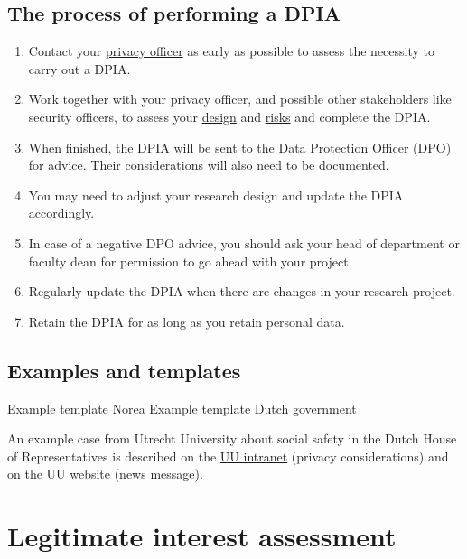 \documentclass[
]{book}
\providecommand{\tightlist}{%
  \setlength{\itemsep}{0pt}\setlength{\parskip}{0pt}}
\begin{document}
\hypertarget{dpia-process}{%
\subsection{The process of performing a DPIA}\label{dpia-process}}

\begin{enumerate}
\def\labelenumi{\arabic{enumi}.}
\tightlist
\item
  Contact your \protect\hyperlink{support}{privacy officer} as early as possible to assess the
  necessity to carry out a DPIA.
\item
  Work together with your privacy officer, and possible other stakeholders like
  security officers, to assess your \protect\hyperlink{privacy-by-design}{design} and
  \protect\hyperlink{risk-assessment}{risks} and complete the DPIA.
\item
  When finished, the DPIA will be sent to the Data Protection Officer (DPO) for
  advice. Their considerations will also need to be documented.
\item
  You may need to adjust your research design and update the DPIA accordingly.
\item
  In case of a negative DPO advice, you should ask your head of department or
  faculty dean for permission to go ahead with your project.
\item
  Regularly update the DPIA when there are changes in your research project.
\item
  Retain the DPIA for as long as you retain personal data.
\end{enumerate}

\hypertarget{examples-and-templates-2}{%
\subsection{Examples and templates}\label{examples-and-templates-2}}

Example template Norea
Example template Dutch government

An example case from Utrecht University about social safety in the Dutch House
of Representatives is described on the
\href{https://intranet.uu.nl/en/news/background/privacy-in-practice-research-into-social-safety-in-the-dutch-house-of-representatives}{UU intranet}
(privacy considerations) and on the
\href{https://www.uu.nl/en/news/utrecht-university-to-study-social-safety-in-dutch-house-of-representatives}{UU website}
(news message).

\hypertarget{legitimate-interest-assessment}{%
\section{Legitimate interest assessment}\label{legitimate-interest-assessment}}
\end{document}
